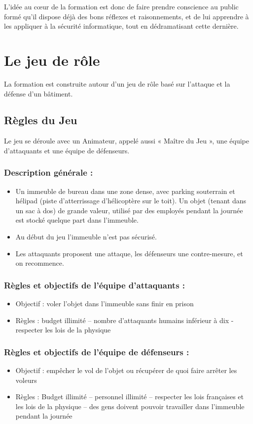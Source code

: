 \documentclass[11pt]{article} %
\begin{document}
L'idée au cœur de la formation est donc de faire prendre conscience au public
formé qu'il dispose déjà des bons réflexes et raisonnements, et de lui apprendre
à les appliquer à la sécurité informatique, tout en dédramatisant cette
dernière.


\section{Le jeu de rôle}
La formation est construite autour d'un jeu de rôle basé sur l'attaque et la
défense d'un bâtiment.

\subsection{Règles du Jeu}
Le jeu se déroule avec un Animateur, appelé aussi « Maître du Jeu », une équipe
d'attaquants et une équipe de défenseurs.

\subsubsection{Description générale :}
\begin{itemize} 
\item Un immeuble de bureau dans une zone dense, avec parking souterrain et
hélipad (piste d'atterrissage d'hélicoptère sur le toit). Un objet (tenant dans
un sac à dos) de grande valeur, utilisé par des employés pendant la journée est
stocké quelque part dans l'immeuble.
    \item Au début du jeu l'immeuble n'est pas sécurisé. 
\item Les attaquants proposent une attaque, les défenseurs une contre-mesure, et
on recommence.
\end{itemize}

\subsubsection{Règles et objectifs de l'équipe d'attaquants :}
\begin{itemize}
    \item Objectif : voler l'objet dans l'immeuble sans finir en prison
\item Règles : budget illimité – nombre d'attaquants humains inférieur à dix -
respecter les lois de la physique
\end{itemize}

\subsubsection{Règles et objectifs de l'équipe de défenseurs :}
\begin{itemize}
\item Objectif : empêcher le vol de l'objet ou récupérer de quoi faire arrêter
les voleurs
\item Règles : Budget illimité – personnel illimité – respecter les lois
françaises et les lois de la physique – des gens doivent pouvoir travailler dans
l'immeuble pendant la journée
\end{itemize}
\end{document}
